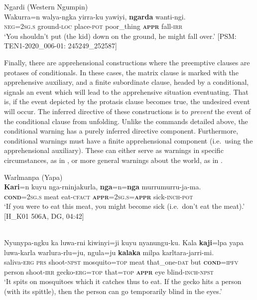 \documentclass[output=paper,colorlinks,citecolor=brown]{langscibook}
\begin{document}
\ea 
\textnormal{Ngardi (Western Ngumpin)} \\
\gll Wakurra=n walya-ngka yirra-ku yawiyi, \textbf{ngarda} wanti-ngi. \\
\textsc{neg=2sg.s} ground-\textsc{loc} place-\textsc{pot} poor\_thing \textbf{\textsc{appr}} fall-\textsc{irr} \\
\glt `You shouldn't put (the kid) down on the ground, he might fall over.' [PSM: TEN1-2020\_006-01: 245249\_252587]
\label{ex:bro76}
\z

 Finally, there are apprehensional constructions where the preemptive clauses are protases of conditionals. In these cases, the matrix clause is marked with the apprehensive auxiliary, and a finite subordinate clause, headed by a conditional, signals an event which will lead to the apprehensive situation eventuating. That is, if the event depicted by the protasis clause becomes true, the undesired event will occur. The inferred directive of these constructions is to \textit{prevent} the event of the conditional clause from unfolding. Unlike the commands detailed above, the conditional warning has a purely inferred directive component. Furthermore, conditional warnings must have a finite apprehensional component (i.e.\  using the apprehensional auxiliary). These can either serve as warnings in specific circumstances, as in , or more general warnings about the world, as in .

 \newpage
\ea 
\textnormal{Warlmanpa (Yapa)} \\
\gll \textbf{Kari}=n kuyu nga-rninjakurla, \textbf{nga}=n=\textbf{nga} murrumurru-ja-ma. \\
\textbf{\textsc{cond}}=\textsc{2sg.s} meat eat-\textsc{cfact} \textbf{\textsc{appr}}=\textsc{2sg.s=\textbf{appr}} sick-\textsc{inch-pot} \\
\glt `If you were to eat this meat, you might become sick (i.e.\  don't eat the meat).' [H\_K01 506A, DG, 04:42]
\label{ex:bro77}
\z

\ea 
{} \\
\gll Nyunypa-ngku ka luwa-rni kiwinyi=ji kuyu nyanungu-ku. Kala \textbf{kaji}=lpa yapa luwa-karla warlura-rlu=ju, ngula=ju \textbf{kalaka} milpa karltara-jarri-mi. \\
saliva-\textsc{erg} \textsc{prs} shoot-\textsc{npst} mosquito=\textsc{top} meat that\_one-\textsc{dat} but \textsc{\textbf{cond}=ipfv} person shoot-\textsc{irr} gecko-\textsc{erg=top} that=\textsc{top} \textsc{\textbf{appr}} eye blind-\textsc{inch-npst} \\
\glt `It spits on mosquitoes which it catches thus to eat. If the gecko hits a person (with its spittle), then the person can go temporarily blind in the eyes.' 
\label{ex:bro78}
\z
\end{document}
